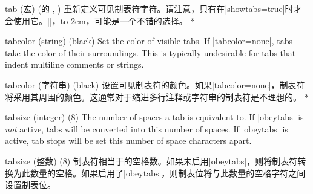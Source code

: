 \begin{optionlist}
\begin{paracol}{2}
\switchcolumn
\item[tab (宏) ({\rmfamily\pkg{fancyvrb}的} \string\FancyVerbTab, \FancyVerbTab)]
重新定义可见制表符字符。请注意，只有在|showtabs=true|时才会使用它。|\rightarrowfill|，\hbox to 2em{\rightarrowfill}，可能是一个不错的选择。
\switchcolumn[0]*%
\item[tabcolor (string) (black)]
Set the color of visible tabs.  If |tabcolor=none|, tabs take the color of their surroundings.  This is typically undesirable for tabs that indent multiline comments or strings.
\switchcolumn
\item[tabcolor (字符串) (black)]
设置可见制表符的颜色。如果|tabcolor=none|，制表符将采用其周围的颜色。这通常对于缩进多行注释或字符串的制表符是不理想的。
\switchcolumn[0]*%
\item[tabsize (integer) (8)]
The number of spaces a tab is equivalent to.  If |obeytabs| is \emph{not} active, tabs will be converted into this number of spaces.  If |obeytabs| is active, tab stops will be set this number of space characters apart.
\switchcolumn
\item[tabsize (整数) (8)]
制表符相当于的空格数。如果未启用|obeytabs|，则将制表符转换为此数量的空格。如果启用了|obeytabs|，则制表位将与此数量的空格字符之间设置制表位。
\end{paracol}
\end{optionlist}
